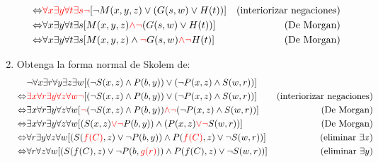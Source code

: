 \documentclass{article}
\begin{document}
\begin{enumerate}
\begin{align*}
          \Leftrightarrow &\textcolor{red}{\forall x} \textcolor{red}{\exists y} \textcolor{red}{\forall t} \textcolor{red}{\exists s} \textcolor{red}{\neg}[\neg M(x, y, z) \vee (G(s, w) \vee H(t))] & (\text{interiorizar negaciones})\\
          \Leftrightarrow &\forall x \exists y \forall t \exists s [M(x, y, z) \textcolor{red}{\land} \textcolor{red}{\neg}(G(s, w) \vee H(t))] & (\text{De Morgan})\\
          \Leftrightarrow &\forall x \exists y \forall t \exists s [M(x, y, z) \land \textcolor{red}{\neg} G(s, w) \textcolor{red}{\land} \textcolor{red}{\neg}H(t)] & (\text{De Morgan})\\
        \end{align*}


        \item Obtenga la forma normal de Skolem de:
        \begin{align*}
          &\neg \forall x \exists r \forall y \exists z \exists w [(\neg S(x, z) \land P(b, y)) \vee (\neg P(x, z) \land S(w, r))] \\
          \Leftrightarrow &\textcolor{red}{\exists x} \textcolor{red}{\forall r} \textcolor{red}{\exists y} \textcolor{red}{\forall z} \textcolor{red}{\forall w} \textcolor{red}{\neg}[(\neg S(x, z) \land P(b, y)) \vee (\neg P(x, z) \land S(w, r))] & (\text{interiorizar negaciones}) \\
          \Leftrightarrow &\exists x \forall r \exists y \forall z \forall w [\textcolor{red}{\neg} (\neg S(x, z) \land P(b, y)) \textcolor{red}{\land} \textcolor{red}{\neg} (\neg P(x, z) \land S(w, r))] & (\text{De Morgan}) \\
          \Leftrightarrow &\exists x \forall r \exists y \forall z \forall w [(S(x, z) \textcolor{red}{\vee \neg} P(b, y)) \land (P(x, z) \textcolor{red}{\vee \neg} S(w, r))] & (\text{De Morgan}) \\
          \Leftrightarrow &\forall r \exists y \forall z \forall w [(S(\textcolor{red}{f(C)}, z) \vee \neg P(b, y)) \land P(\textcolor{red}{f(C)}, z) \vee \neg S(w, r))] & (\text{eliminar }\exists x) \\
          \Leftrightarrow &\forall r \forall z \forall w [(S(f(C), z) \vee \neg P(b, \textcolor{red}{g(r)})) \land P(f(C), z) \vee \neg S(w, r))] & (\text{eliminar } \exists y) \\
        \end{align*}
\end{enumerate}
\end{document}

